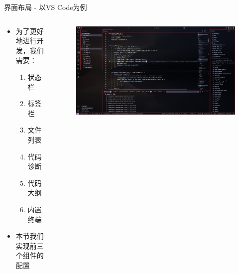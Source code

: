 \documentclass[aspectratio=169]{ctexbeamer}
\begin{document}
    \begin{frame}{界面布局 - 以VS Code为例}

      \begin{columns}
        \begin{column}{0.25\linewidth}
          \begin{itemize}
            \item 为了更好地进行开发，我们需要：%
              \begin{enumerate}[label=\arabic*.]
                \item 状态栏
                \item 标签栏
                \item 文件列表
                \item 代码诊断
                \item 代码大纲
                \item 内置终端
              \end{enumerate}
            \item 本节我们实现前三个组件的配置
          \end{itemize}
        \end{column}

        \begin{column}{0.75\linewidth}
          \begin{figure}[H]
            \centering
            \includegraphics[width=0.9\linewidth]{./Figures/Vscode_interface_annotated.jpg}
          \end{figure}
        \end{column}
      \end{columns}

    \end{frame}
\end{document}
